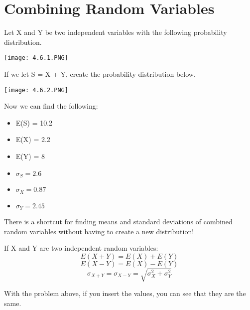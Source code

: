 \documentclass[../stats.tex]{subfiles}
\begin{document}
\section{Combining Random Variables}
\begin{example}
    Let X and Y be two independent variables with the following probability distribution.
    \begin{center}
        \texttt{[image: 4.6.1.PNG]}
    \end{center}
    If we let S = X + Y, create the probability distribution below.
    \begin{center}
        \texttt{[image: 4.6.2.PNG]}
    \end{center}

    Now we can find the following:
    \begin{itemize}
        \item E(S) = 10.2 
        \item E(X) = 2.2
        \item E(Y) = 8
        \item $\sigma_S = 2.6$
        \item $\sigma_X = 0.87$
        \item $\sigma_Y = 2.45$
    \end{itemize}
\end{example}

There is a shortcut for finding means and standard deviations of combined random variables without having to create a new distribution!

If X and Y are two independent random variables:
\[ E(X+Y)=E(X)+E(Y)\]
\[ E(X-Y)=E(X)-E(Y)\]
\[ \sigma_{X+Y}=\sigma_{X-Y}=\sqrt{\sigma_X^2+\sigma_Y^2}\]

With the problem above, if you insert the values, you can see that they are the same.
\end{document}
